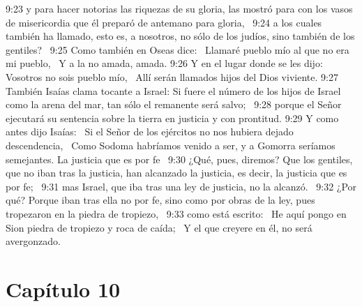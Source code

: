 9:23 y para hacer notorias las riquezas de su gloria, las mostró para con los vasos de misericordia que él preparó de antemano para gloria,  
9:24 a los cuales también ha llamado, esto es, a nosotros, no sólo de los judíos, sino también de los gentiles?  
9:25 Como también en Oseas dice:  
Llamaré pueblo mío al que no era mi pueblo,  
Y a la no amada, amada. 
9:26 Y en el lugar donde se les dijo: Vosotros no sois pueblo mío,  
Allí serán llamados hijos del Dios viviente. 
9:27 También Isaías clama tocante a Israel: Si fuere el número de los hijos de Israel como la arena del mar, tan sólo el remanente será salvo;  
9:28 porque el Señor ejecutará su sentencia sobre la tierra en justicia y con prontitud. 
9:29 Y como antes dijo Isaías:  
Si el Señor de los ejércitos no nos hubiera dejado descendencia,  
Como Sodoma habríamos venido a ser, y a Gomorra seríamos semejantes. 
La justicia que es por fe  
9:30 ¿Qué, pues, diremos? Que los gentiles, que no iban tras la justicia, han alcanzado la justicia, es decir, la justicia que es por fe;  
9:31 mas Israel, que iba tras una ley de justicia, no la alcanzó.  
9:32 ¿Por qué? Porque iban tras ella no por fe, sino como por obras de la ley, pues tropezaron en la piedra de tropiezo,  
9:33 como está escrito:  
He aquí pongo en Sion piedra de tropiezo y roca de caída;  
Y el que creyere en él, no será avergonzado. 
\section*{Capítulo 10}

